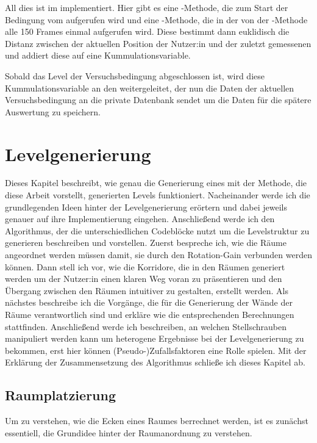 All dies ist im  implementiert. Hier gibt es eine -Methode, die zum Start der Bedingung vom  aufgerufen wird und eine -Methode, die in der von der -Methode alle 150 Frames einmal aufgerufen wird. Diese bestimmt dann euklidisch die Distanz zwischen der aktuellen Position der Nutzer:in und der zuletzt gemessenen und addiert diese auf eine Kummulationsvariable.

Sobald das Level der Versuchsbedingung abgeschlossen ist, wird diese Kummulationsvariable an den  weitergeleitet, der nun die Daten der aktuellen Versuchsbedingung an die private Datenbank sendet um die Daten für die spätere Auswertung zu speichern.

\chapter{Levelgenerierung}
\label{chapter:generate}
Dieses Kapitel beschreibt, wie genau die Generierung eines mit der Methode, die diese Arbeit vorstellt, generierten Levels funktioniert. Nacheinander werde ich die grundlegenden Ideen hinter der Levelgenerierung erörtern und dabei jeweils genauer auf ihre Implementierung eingehen. Anschließend werde ich den Algorithmus, der die unterschiedlichen Codeblöcke nutzt um die Levelstruktur zu generieren beschreiben und vorstellen.
Zuerst bespreche ich, wie die Räume angeordnet werden müssen damit, sie durch den Rotation-Gain verbunden werden können. Dann stell ich vor, wie die Korridore, die in den Räumen generiert werden um der Nutzer:in einen klaren Weg voran zu präsentieren und den Übergang zwischen den Räumen intuitiver zu gestalten, erstellt werden. Als nächstes beschreibe ich die Vorgänge, die für die Generierung der Wände der Räume verantwortlich sind und erkläre wie die entsprechenden Berechnungen stattfinden.
Anschließend werde ich beschreiben, an welchen Stellschrauben manipuliert werden kann um heterogene Ergebnisse bei der Levelgenerierung zu bekommen, erst hier können (Pseudo-)Zufallsfaktoren eine Rolle spielen.
Mit der Erklärung der Zusammensetzung des Algorithmus schließe ich dieses Kapitel ab.

\section{Raumplatzierung}

Um zu verstehen, wie die Ecken eines Raumes berrechnet werden, ist es zunächst essentiell, die Grundidee hinter der Raumanordnung zu verstehen.


